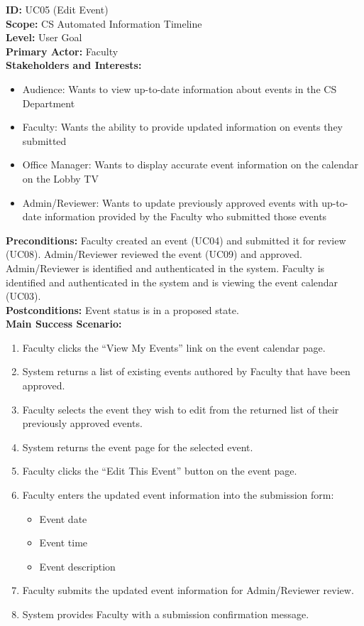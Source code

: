 \textbf{ID:} UC05 (Edit Event) \\
\textbf{Scope:} CS Automated Information Timeline \\
\textbf{Level:} User Goal \\
\textbf{Primary Actor:} Faculty \\
\textbf{Stakeholders and Interests:}
\begin{itemize}
    \item Audience: Wants to view up-to-date information about events in the CS Department
    \item Faculty: Wants the ability to provide updated information on events they submitted
    \item Office Manager: Wants to display accurate event information on the calendar on the Lobby TV
    \item Admin/Reviewer: Wants to update previously approved events with up-to-date information provided by the Faculty who submitted those events
\end{itemize}
\textbf{Preconditions:} Faculty created an event (UC04) and submitted it for review (UC08). Admin/Reviewer reviewed the event (UC09) and approved. Admin/Reviewer is identified and authenticated in the system. Faculty is identified and authenticated in the system and is viewing the event calendar (UC03). \\
\textbf{Postconditions:} Event status is in a proposed state. \\
\textbf{Main Success Scenario:}
\begin{enumerate}
    \item Faculty clicks the ``View My Events'' link on the event calendar page.
    \item System returns a list of existing events authored by Faculty that have been approved.
    \item Faculty selects the event they wish to edit from the returned list of their previously approved events.
    \item System returns the event page for the selected event.
    \item Faculty clicks the “Edit This Event” button on the event page.
    \item Faculty enters the updated event information into the submission form:
          \begin{itemize}
              \item Event date
              \item Event time
              \item Event description
          \end{itemize}
    \item Faculty submits the updated event information for Admin/Reviewer review.
    \item System provides Faculty with a submission confirmation message.
\end{enumerate}
